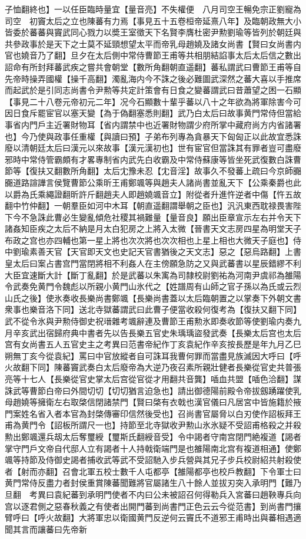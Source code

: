 子恤翻終也】一以任臣臨時量宜【量音亮】不失權便　八月司空王暢免宗正劉寵為司空　初竇太后之立也陳蕃有力焉【事見五十五卷桓帝延熹八年】及臨朝政無大小皆委於蕃蕃與竇武同心戮力以奬王室徵天下名賢李膺杜密尹勲劉瑜等皆列於朝廷與共參政事於是天下之士莫不延頸想望太平而帝乳母趙嬈及諸女尚書【賢曰女尚書内官也嬈音乃了翻】旦夕在太后側中常侍曹節王甫等共相朋結諂事太后太后信之數出詔命有所封拜蕃武疾之嘗共會朝堂【數所角翻朝直遥翻】蕃私謂武曰曹節王甫等自先帝時操弄國權【操千高翻】濁亂海内今不誅之後必難圖武深然之蕃大喜以手推席而起武於是引同志尚書令尹勲等共定計策會有日食之變蕃謂武曰昔蕭望之困一石顯【事見二十八卷元帝初元二年】况今石顯數十輩乎蕃以八十之年欲為將軍除害今可因日食斥罷宦官以塞天變【為于偽翻塞悉則翻】武乃白太后曰故事黄門常侍但當給事省内門戶主近署財物耳【省内謂禁中也近署財物謂少府所掌中藏府尚方内省諸署也】今乃使與政事任重權【與讀曰預】子弟布列專為貪暴天下匈匈正以此故宜悉誅廢以清朝廷太后曰漢元以來故事【漢元漢初也】世有宦官但當誅其有罪者豈可盡廢邪時中常侍管霸頗有才畧專制省内武先白收霸及中常侍蘇康等皆坐死武復數白誅曹節等【復扶又翻數所角翻】太后冘豫未忍【冘音淫】故事久不發蕃上疏曰今京師嚻嚻道路諠譁言侯覽曹節公乘昕王甫鄭颯等與趙夫人諸尚書並亂天下【公乘秦爵也此以爵為氏乘繩證翻昕許斤翻趙夫人即趙嬈颯音立】附從者升進忤逆者中傷【忤五故翻中竹仲翻】一朝羣臣如河中木耳【朝直遥翻謂舉朝之臣也】汎汎東西耽禄畏害陛下今不急誅此曹必生變亂傾危社稷其禍難量【量音良】願出臣章宣示左右并令天下諸姦知臣疾之太后不納是月太白犯房之上將入太微【晉書天文志房四星為明堂天子布政之宫也亦四輔也第一星上將也次次將也次次相也上星上相也大微天子庭也】侍中劉瑜素善天官【天官即天文也史記天官書猶後之天文志】惡之【惡烏路翻】上書皇太后曰案占書宫門當閉將相不利姦人在主傍願急防之又與武蕃書以星辰錯繆不利大臣宜速斷大計【斷丁亂翻】於是武蕃以朱㝢為司隸校尉劉祐為河南尹虞祁為雒陽令武奏免黄門令魏彪以所親小黄門山氷代之【姓譜周有山師之官子孫以為氏或云烈山氏之後】使氷奏收長樂尚書鄭颯【長樂尚書蓋以太后臨朝置之以掌奏下外朝文書衆事也樂音洛下同】送北寺獄蕃謂武曰此曹子便當收殺何復考為【復扶又翻下同】武不從令氷與尹勲侍御史祝瑨雜考颯辭連及曹節王甫勲氷即奏收節等使劉瑜内奏九月辛亥武出宿歸府典中書者先以告長樂五官史朱瑀瑀盜發武奏【長樂太后宫也太后宫有女尚書五人五官史主之考異曰范書帝紀作丁亥袁紀作辛亥按長歷是年九月乙巳朔無丁亥今從袁紀】罵曰中官放縱者自可誅耳我曹何罪而當盡見族滅因大呼曰【呼火故翻下同】陳蕃竇武奏白太后廢帝為大逆乃夜召素所親壯健者長樂從官史共普張亮等十七人【長樂從官史掌太后宫從官從才用翻共音龔】喢血共盟【喢色洽翻】謀誅武等曹節白帝曰外間切切【切切猶言迫急也】請出御德陽前殿令帝拔劔踴躍使乳母趙嬈等擁衛左右取棨信閉諸禁門【賢曰棨有衣戟也漢官儀曰凡居宮中皆施籍於掖門案姓名省入者本官為封棨傳審印信然後受也】召尚書官屬脅以白刃使作詔板拜王甫為黄門令【詔板所謂尺一也】持節至北寺獄收尹勲山氷氷疑不受詔甫格殺之并殺勲出鄭颯還兵刼太后奪璽綬【璽斯氏翻綬音受】令中謁者守南宫閉門絶複道【謁者掌守門戶文帝自代邸人立有謁者十人持戟衛端門是也雒陽南北宫有複道相通】使鄭颯等持節及侍御史謁者捕收武等武不受詔馳入步兵營與其兄子步兵校尉紹共射殺使者【射而亦翻】召會北軍五校士數千人屯都亭【雒陽都亭也校戶教翻】下令軍士曰黄門常侍反盡力者封侯重賞陳蕃聞難將官屬諸生八十餘人並拔刃突入承明門【難乃旦翻　考異曰袁紀蕃到承明門使者不内曰公未被詔召何得勒兵入宮蕃曰趙鞅專兵向宫以逐君側之惡春秋義之有使者出開門蕃到尚書門正色云云今從范書】到尚書門攘臂呼曰【呼火故翻】大將軍忠以衛國黄門反逆何云竇氏不道邪王甫時出與蕃相遇適聞其言而讓蕃曰先帝新